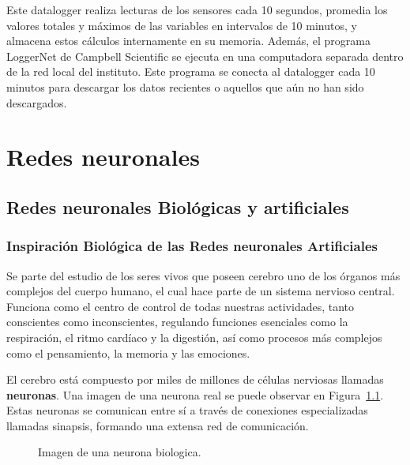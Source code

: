 \documentclass[
  us-letterpaper,
]{scrreprt}
\theoremstyle{plain}
\theoremstyle{definition}
\theoremstyle{definition}
\theoremstyle{remark}
\begin{document}
Este datalogger realiza lecturas de los sensores cada 10 segundos,
promedia los valores totales y máximos de las variables en intervalos de
10 minutos, y almacena estos cálculos internamente en su memoria.
Además, el programa LoggerNet de Campbell Scientific se ejecuta en una
computadora separada dentro de la red local del instituto. Este programa
se conecta al datalogger cada 10 minutos para descargar los datos
recientes o aquellos que aún no han sido descargados.

\part{Redes neuronales}

\chapter{Redes neuronales Biológicas y
artificiales}\label{redes-neuronales-bioluxf3gicas-y-artificiales}

\section{Inspiración Biológica de las Redes neuronales
Artificiales}\label{inspiraciuxf3n-bioluxf3gica-de-las-redes-neuronales-artificiales}

Se parte del estudio de los seres vivos que poseen cerebro uno de los
órganos más complejos del cuerpo humano, el cual hace parte de un
sistema nervioso central. Funciona como el centro de control de todas
nuestras actividades, tanto conscientes como inconscientes, regulando
funciones esenciales como la respiración, el ritmo cardíaco y la
digestión, así como procesos más complejos como el pensamiento, la
memoria y las emociones.

El cerebro está compuesto por miles de millones de células nerviosas
llamadas \textbf{neuronas}. Una imagen de una neurona real se puede
observar en Figura~\ref{fig-neu}. Estas neuronas se comunican entre sí a
través de conexiones especializadas llamadas sinapsis, formando una
extensa red de comunicación.

\begin{figure}


\caption{\label{fig-neu}Imagen de una neurona biologica.}

\end{figure}%
\end{document}
